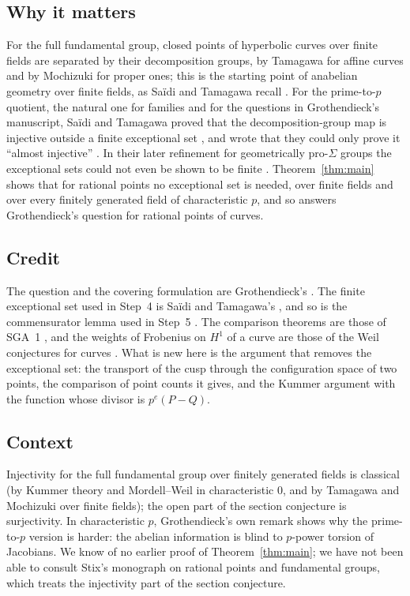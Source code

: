 \documentclass[11pt]{amsart}
\theoremstyle{remark}
\begin{document}
\subsection{Why it matters}
For the full fundamental group, closed points of hyperbolic curves over finite fields are separated by their decomposition groups, by Tamagawa for affine curves and by Mochizuki for proper ones; this is the starting point of anabelian geometry over finite fields, as Sa\"idi and Tamagawa recall \cite[Introduction, p.~3]{ST09}. For the prime-to-$p$ quotient, the natural one for families and for the questions in Grothendieck's manuscript, Sa\"idi and Tamagawa proved that the decomposition-group map is injective outside a finite exceptional set \cite[Definitions 1.3, 1.5, 1.10 and Proposition 1.8(vi)]{ST09}, and wrote that they could only prove it ``almost injective'' \cite[p.~3]{ST09}. In their later refinement for geometrically pro-$\Sigma$ groups the exceptional sets could not even be shown to be finite \cite[Introduction, pp.~4--5]{ST18}. Theorem~\ref{thm:main} shows that for rational points no exceptional set is needed, over finite fields and over every finitely generated field of characteristic $p$, and so answers Grothendieck's question for rational points of curves.

\subsection{Credit}
The question and the covering formulation are Grothendieck's \cite[cote 149, ms.~pp.~17--18]{Archive}. The finite exceptional set used in Step~4 is Sa\"idi and Tamagawa's \cite{ST09}, and so is the commensurator lemma used in Step~5 \cite[Lemma 1.7]{ST09}. The comparison theorems are those of SGA~1 \cite{SGA1}, and the weights of Frobenius on $H^1$ of a curve are those of the Weil conjectures for curves \cite[(1.5.1) and Th\'eor\`eme 1.6]{WeilI}. What is new here is the argument that removes the exceptional set: the transport of the cusp through the configuration space of two points, the comparison of point counts it gives, and the Kummer argument with the function whose divisor is $p^e(P-Q)$.

\subsection{Context}
Injectivity for the full fundamental group over finitely generated fields is classical (by Kummer theory and Mordell--Weil in characteristic $0$, and by Tamagawa and Mochizuki over finite fields); the open part of the section conjecture is surjectivity. In characteristic $p$, Grothendieck's own remark shows why the prime-to-$p$ version is harder: the abelian information is blind to $p$-power torsion of Jacobians. We know of no earlier proof of Theorem~\ref{thm:main}; we have not been able to consult Stix's monograph on rational points and fundamental groups, which treats the injectivity part of the section conjecture.
\end{document}
